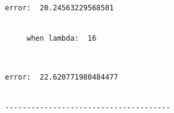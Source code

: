 \documentclass[11pt]{article}
\begin{document}
    \begin{Verbatim}[commandchars=\\\{\}]
     error:  20.24563229568501


     when lambda:  16

    \end{Verbatim}

    \begin{center}
    \end{center}
    { \hspace*{\fill} \\}
    
    \begin{Verbatim}[commandchars=\\\{\}]
     error:  22.620771980484477


--------------------------------------

    \end{Verbatim}


    
    
    
    
\end{document}
